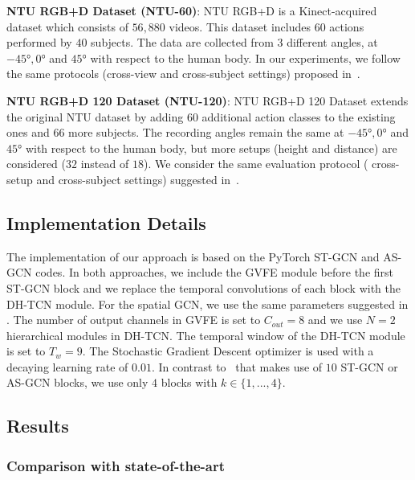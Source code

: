 \documentclass{article}
\begin{document}
\textbf{NTU RGB+D Dataset (NTU-60)}: NTU RGB+D is a Kinect-acquired dataset which consists of $56,880$ videos. This dataset includes $60$ actions performed by $40$ subjects. The data are collected from $3$ different angles, at $\ang{-45}, \ang{0}$ and $\ang{45}$ with respect to the human body. In our experiments, we follow the same protocols (cross-view and cross-subject settings) proposed in~\cite{Shahroudy_2016_NTURGBD}.

\noindent \textbf{NTU RGB+D 120 Dataset (NTU-120)}: NTU RGB+D 120 Dataset extends the original NTU dataset by adding $60$ additional action classes to the existing ones and $66$ more subjects. The recording angles remain the same at $\ang{-45}, \ang{0}$ and $\ang{45}$ with respect to the human body, but more setups (height and distance) are considered ($32$ instead of $18$). We consider the same evaluation protocol ( cross-setup and cross-subject settings) suggested in~\cite{Liu_2019_NTURGBD120}.



\subsection{Implementation Details}
\label{sec:implementation}

The implementation of our approach is based on the PyTorch ST-GCN \cite{yan2018spatial} and AS-GCN \cite{li2019actional} codes. In both approaches, we include the GVFE module before the first ST-GCN block and we replace the temporal convolutions of each block with the DH-TCN module. For the spatial GCN, we use the same parameters suggested in \cite{yan2018spatial}. The number of output channels in GVFE is set to $C_{out}=8$ and we use $N=2$ hierarchical modules in DH-TCN. The temporal window of the DH-TCN module is set to $T_w=9$. The Stochastic Gradient Descent optimizer is used with a decaying learning rate of $0.01$. In contrast to~\cite{yan2018spatial, li2019actional} that makes use of $10$ ST-GCN or AS-GCN blocks, we use only $4$ blocks with $k \in \{1,...,4\}$.

\subsection{Results}
\label{sec:results}



\subsubsection{Comparison with state-of-the-art}
\end{document}
